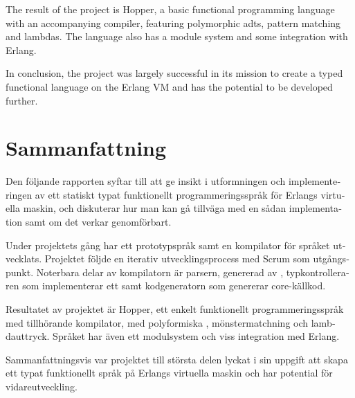 The result of the project is Hopper, a basic functional programming language with an accompanying compiler, featuring polymorphic \glspl{adt}, pattern matching and lambdas. The language also has a module system and some integration with Erlang. 

In conclusion, the project was largely successful in its mission to create a typed functional language on the Erlang VM and has the potential to be developed further.

\section*{Sammanfattning}

\begin{otherlanguage}{swedish}
Den följande rapporten syftar till att ge insikt i utformningen och implementeringen av ett statiskt typat funktionellt programmeringsspråk för Erlangs virtuella maskin, och diskuterar hur man kan gå tillväga med en sådan implementation samt om det verkar genomförbart.

Under projektets gång har ett prototypspråk samt en kompilator för språket utvecklats. Projektet följde en iterativ utvecklingsprocess med Scrum som utgångspunkt. Noterbara delar av kompilatorn är parsern, genererad av , typkontrolleraren som implementerar ett  samt kodgeneratorn som genererar \gls{core}-källkod.

Resultatet av projektet är Hopper, ett enkelt funktionellt programmeringsspråk med tillhörande kompilator, med polyformiska , mönstermatchning och lambdauttryck. Språket har även ett modulsystem och viss integration med Erlang.

Sammanfattningsvis var projektet till största delen lyckat i sin uppgift att skapa ett typat funktionellt språk på Erlangs virtuella maskin och har potential för vidareutveckling.
\end{otherlanguage}


\newpage				%
\thispagestyle{empty}
\mbox{}